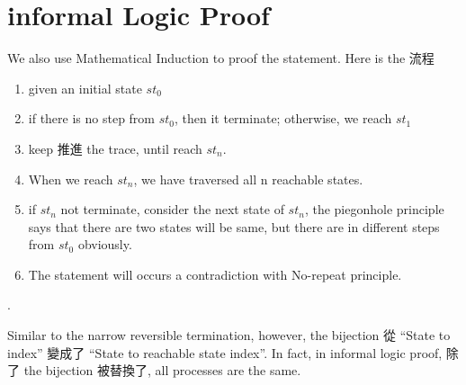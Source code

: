 \section{ informal Logic Proof }

We also use Mathematical Induction to proof the statement.  Here is the 流程

\begin{enumerate}[1.]
    \item given an initial state $st_{0}$
    \item if there is no step from $st_{0}$, then it terminate; otherwise, we reach $st_{1}$
    \item keep 推進 the trace, until reach $st_{n}$.
    \item When we reach $st_{n}$, we have traversed all n reachable states.
    \item if $st_{n}$ not terminate, consider the next state of $st_{n}$, the piegonhole principle says that there are two states will be same, but there are in different steps from $st_{0}$ obviously.
    \item The statement will occurs a contradiction with No-repeat principle.
\end{enumerate}.

Similar to the narrow reversible termination, however, the bijection 從 ``State to index'' 變成了 ``State to reachable state index''.
In fact, in informal logic proof, 除了 the bijection 被替換了, all processes are the same.
